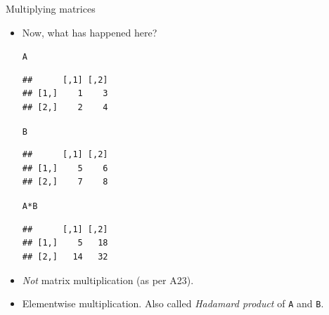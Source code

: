 \documentclass[unknownkeysallowed]{beamer}\usepackage[]{graphicx}\usepackage[]{color}
\makeatletter
\newcommand{\hlopt}[1]{\textcolor[rgb]{0,0,0}{#1}}%
\newcommand{\hlstd}[1]{\textcolor[rgb]{0.345,0.345,0.345}{#1}}%
\newenvironment{kframe}{%
 \def\at@end@of@kframe{}%
 \ifinner\ifhmode%
  \def\at@end@of@kframe{\end{minipage}}%
  \begin{minipage}{\columnwidth}%
 \fi\fi%
 \def\FrameCommand##1{\hskip\@totalleftmargin \hskip-\fboxsep
 \colorbox{shadecolor}{##1}\hskip-\fboxsep
     \hskip-\linewidth \hskip-\@totalleftmargin \hskip\columnwidth}%
 \MakeFramed {\advance\hsize-\width
   \@totalleftmargin\z@ \linewidth\hsize
   \@setminipage}}%
 {\par\unskip\endMakeFramed%
 \at@end@of@kframe}
\newenvironment{knitrout}{}{} %
\makeatother
\begin{document}
\begin{frame}[fragile]{Multiplying matrices}

  \begin{itemize}
  \item Now, what has happened here?

    \begin{multicols}{2}
\begin{knitrout}
\color{fgcolor}\begin{kframe}
\begin{alltt}
\hlstd{A}
\end{alltt}
\begin{verbatim}
##      [,1] [,2]
## [1,]    1    3
## [2,]    2    4
\end{verbatim}
\begin{alltt}
\hlstd{B}
\end{alltt}
\begin{verbatim}
##      [,1] [,2]
## [1,]    5    6
## [2,]    7    8
\end{verbatim}
\end{kframe}
\end{knitrout}

\begin{knitrout}
\color{fgcolor}\begin{kframe}
\begin{alltt}
\hlstd{A}\hlopt{*}\hlstd{B}
\end{alltt}
\begin{verbatim}
##      [,1] [,2]
## [1,]    5   18
## [2,]   14   32
\end{verbatim}
\end{kframe}
\end{knitrout}
    \end{multicols}
\item \emph{Not} matrix multiplication (as per A23).
\item Elementwise multiplication. Also called \emph{Hadamard product}
  of \texttt{A} and \texttt{B}.
  \end{itemize}
  
\end{frame}
\end{document}
